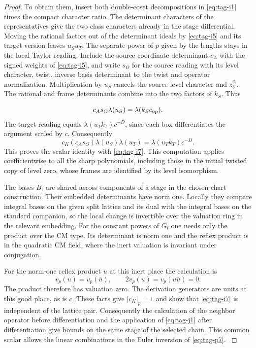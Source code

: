 \begin{proof}

To obtain them, insert both double-coset decompositions in
\eqref{eq:tag-i1} times the compact character ratio. The determinant
characters of the representatives give the two class characters
already in the stage differential. Moving the rational factors
out of the determinant ideals by \eqref{eq:tag-i5} and its target version
leaves \(u_Su_T\). The separate power of \(p\) given by the
lengths stays in the local Taylor reading. Include the source
coordinate determinant \(c_A\) with the signed weights of \eqref{eq:tag-i5},
and write \(s_O\) for the source reading with its level character,
twist, inverse basis determinant to the twist and operator
normalization. Multiplication by \(u_S\) cancels the source
level character and \(z_b^{q_i}\). The rational and frame
determinants combine into the two factors of \(k_S\). Thus

\[
  c_A s_O\lambda(u_S)=\lambda(k_S c_{\rm op}).
\]
 The target
reading equals \(\lambda(u_T k_T)c^{-D}\), since each box
differentiates the argument scaled by \(c\). Consequently
\[
  c_K(c_A s_O)\lambda(u_S)\lambda(u_T)=\lambda(u_T k_T)c^{-D}.
\]
This proves the scalar identity with \eqref{eq:tag-i7}.
This computation applies coefficientwise to all the sharp
polynomials, including those in the initial twisted copy of
level zero, whose frames are identified by its level isomorphism.


The bases \(B_i\) are shared across components of a stage in the
chosen chart construction. Their embedded determinants have norm
one. Locally they compare integral bases on the given split
lattice and its dual with the integral bases on the standard
companion, so the local change is invertible over the valuation
ring in the relevant embedding. For the constant powers of \(G_i\)
one needs only the product over the CM type. Its determinant is
norm one and the reflex product is in the quadratic CM field,
where the inert valuation is invariant under conjugation.

For the norm-one reflex product \(u\) at this inert place the calculation is
\[
  v_p(u)=v_p(\bar u),\qquad 2v_p(u)=v_p(u\bar u)=0 .
\]
 The
product therefore has valuation zero. The derivation generators
are units at this good place, as is \(c\). These facts give
\(|c_K|_p=1\) and show that \eqref{eq:tag-i7} is independent of the lattice
pair. Consequently the calculation of the neighbor operator
before differentiation and the application of \eqref{eq:tag-j1} after
differentiation give bounds on the same stage of the selected
chain. This common scalar allows the linear combinations in the
Euler inversion of \eqref{eq:tag-p7}. \label{cor:incident-sections-5}
\end{proof}
